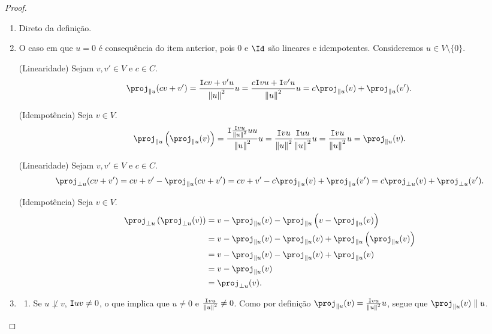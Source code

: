 \begin{proof}
	\begin{enumerate}
	\item Direto da definição.
	
	\item O caso em que $u = 0$ é consequência do item anterior, pois $0$ e $\Id$ são lineares e idempotentes. Consideremos $u \in V \setminus \{0\}$.

	(Linearidade) Sejam $v,v' \in V$ e $c \in C$.
	\begin{equation*}
	\proj_{\parallel u}(cv+v') = \frac{\inte{cv+v'}{u}}{\nor{u}^2}u = \frac{c\inte{v}{u} + \inte{v'}{u}}{\nor{u}^2}u = c\proj_{\parallel u}(v) + \proj_{\parallel u}(v').
	\end{equation*}	
	
(Idempotência) Seja $v \in V$.
		\begin{equation*}
		\proj_{\parallel u}\left( \proj_{\parallel u}(v) \right) = \frac{\inte{\frac{\inte{v}{u}}{\nor{u}^2}u}{u}}{\nor{u}^2}u = \frac{\inte{v}{u}}{\nor{u}^2}\frac{\inte{u}{u}}{\nor{u}^2}u = \frac{\inte{v}{u}}{\nor{u}^2}u = \proj_{\parallel u}(v).
		\end{equation*}
		
(Linearidade) Sejam $v,v' \in V$ e $c \in C$.
	\begin{equation*}
	\proj_{\perp u}(cv+v') = cv+v' - \proj_{\parallel u}(cv+v') = cv+v' - c\proj_{\parallel u}(v) + \proj_{\parallel u}(v') = c\proj_{\perp u}(v) + \proj_{\perp u}(v').
	\end{equation*}

(Idempotência) Seja $v \in V$.
	\begin{align*}
	\proj_{\perp u}\left( \proj_{\perp u}(v) \right) &= v - \proj_{\parallel u}(v) - \proj_{\parallel u}\left( v - \proj_{\parallel u}(v) \right) \\
		&= v - \proj_{\parallel u}(v) - \proj_{\parallel u}(v) + \proj_{\parallel u}\left( \proj_{\parallel u}(v) \right) \\
		&= v - \proj_{\parallel u}(v) - \proj_{\parallel u}(v) + \proj_{\parallel u}(v) \\
		&= v - \proj_{\parallel u}(v) \\
		&= \proj_{\perp u}(v).
	\end{align*}

	\item	
		\begin{enumerate}
		\item Se $u \not\perp v$, $\mathtt I{u}{v} \neq 0$, o que implica que $u \neq 0$ e $\frac{\mathtt I{v}{u}}{\left\Vert{u}\right\Vert^2} \neq 0$. Como por definição $\proj_{\parallel u}(v) = \frac{\inte{v}{u}}{\nor{u}^2}u$, segue que $\proj_{\parallel u}(v) \parallel u$.
		

\end{enumerate}
\end{enumerate}
\end{proof}
